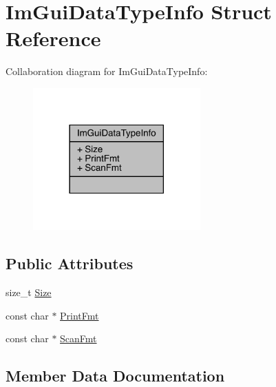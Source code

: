 \hypertarget{struct_im_gui_data_type_info}{}\section{Im\+Gui\+Data\+Type\+Info Struct Reference}
\label{struct_im_gui_data_type_info}


Collaboration diagram for Im\+Gui\+Data\+Type\+Info\+:
\nopagebreak
\begin{figure}[H]
\begin{center}
\leavevmode
\includegraphics[width=182pt]{d3/dd9/struct_im_gui_data_type_info__coll__graph}
\end{center}
\end{figure}
\subsection*{Public Attributes}
\begin{DoxyCompactItemize}
\item 
size\+\_\+t \mbox{\hyperlink{struct_im_gui_data_type_info_a49a2b2d99b93b7db968a74d92380ecbf}{Size}}
\item 
const char $\ast$ \mbox{\hyperlink{struct_im_gui_data_type_info_aa66ad5a40cbfe164121fcd0f35abd438}{Print\+Fmt}}
\item 
const char $\ast$ \mbox{\hyperlink{struct_im_gui_data_type_info_aaa2d211e7cc5f03786f82650b69e9cf3}{Scan\+Fmt}}
\end{DoxyCompactItemize}


\subsection{Member Data Documentation}
\mbox{\label{struct_im_gui_data_type_info_aa66ad5a40cbfe164121fcd0f35abd438}} 
